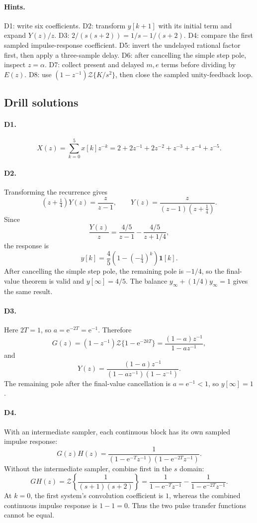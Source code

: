 \documentclass[11pt]{article}
\newcommand{\Z}{\mathcal{Z}}
\newcommand{\e}{\mathrm{e}}
\newcommand{\unitstep}{\mathbf{1}}
\begin{document}
\paragraph{Hints.}
D1: write six coefficients.  D2: transform $y[k+1]$ with its initial term and expand $Y(z)/z$.  D3: $2/(s(s+2))=1/s-1/(s+2)$.  D4: compare the first sampled impulse-response coefficient.  D5: invert the undelayed rational factor first, then apply a three-sample delay.  D6: after cancelling the simple step pole, inspect $z=\alpha$.  D7: collect present and delayed $m,e$ terms before dividing by $E(z)$.  D8: use $(1-z^{-1})\Z\{K/s^2\}$, then close the sampled unity-feedback loop.

\subsection{Drill solutions}

\paragraph{D1.}
\[
X(z)=\sum_{k=0}^{5}x[k]z^{-k}
=2+2z^{-1}+2z^{-2}+z^{-3}+z^{-4}+z^{-5}.
\]

\paragraph{D2.}
Transforming the recurrence gives
\[
(z+\tfrac14)Y(z)=\frac{z}{z-1},
\qquad
Y(z)=\frac{z}{(z-1)(z+\tfrac14)}.
\]
Since
\[
\frac{Y(z)}{z}=\frac{4/5}{z-1}-\frac{4/5}{z+1/4},
\]
the response is
\[
y[k]=\frac45\left(1-\left(-\tfrac14\right)^k\right)\unitstep[k].
\]
After cancelling the simple step pole, the remaining pole is $-1/4$, so the final-value theorem is valid and $y[\infty]=4/5$.  The balance $y_\infty+(1/4)y_\infty=1$ gives the same result.

\paragraph{D3.}
Here $2T=1$, so $a=\e^{-2T}=\e^{-1}$.  Therefore
\[
G(z)=(1-z^{-1})\Z\{1-\e^{-2kT}\}
=\frac{(1-a)z^{-1}}{1-az^{-1}},
\]
and
\[
Y(z)=\frac{(1-a)z^{-1}}{(1-az^{-1})(1-z^{-1})}.
\]
The remaining pole after the final-value cancellation is $a=\e^{-1}<1$, so $y[\infty]=1$.

\paragraph{D4.}
With an intermediate sampler, each continuous block has its own sampled impulse response:
\[
G(z)H(z)=\frac{1}{(1-\e^{-T}z^{-1})(1-\e^{-2T}z^{-1})}.
\]
Without the intermediate sampler, combine first in the $s$ domain:
\[
GH(z)=\Z\!\left\{\frac{1}{(s+1)(s+2)}\right\}
=\frac{1}{1-\e^{-T}z^{-1}}-
\frac{1}{1-\e^{-2T}z^{-1}}.
\]
At $k=0$, the first system's convolution coefficient is $1$, whereas the combined continuous impulse response is $1-1=0$.  Thus the two pulse transfer functions cannot be equal.
\end{document}
